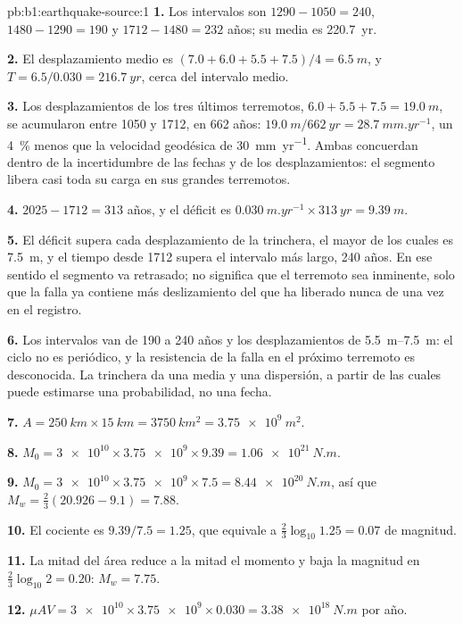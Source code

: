 \begin{solution}{pb:b1:earthquake-source:1}
\textbf{1.} Los intervalos son $1290 - 1050 = 240$, $1480 - 1290 = 190$ y
$1712 - 1480 = 232$ años; su media es \qty{220.7}{yr}.

\textbf{2.} El desplazamiento medio es $(7.0 + 6.0 + 5.5 + 7.5)/4 = \qty{6.5}{m}$, y
$T = 6.5/0.030 = \qty{216.7}{yr}$, cerca del intervalo medio.

\textbf{3.} Los desplazamientos de los tres últimos terremotos, $6.0 + 5.5 + 7.5 =
\qty{19.0}{m}$, se acumularon entre 1050 y 1712, en 662 años: $\qty{19.0}{m}
/\qty{662}{yr} = \qty{28.7}{mm.yr^{-1}}$, un \qty{4}{\percent} menos que la
velocidad geodésica de \qty{30}{mm.yr^{-1}}. Ambas concuerdan dentro de la incertidumbre de las
fechas y de los desplazamientos: el segmento libera casi toda su carga en sus grandes terremotos.

\textbf{4.} $2025 - 1712 = 313$ años, y el déficit es
$\qty{0.030}{m.yr^{-1}}\times\qty{313}{yr} = \qty{9.39}{m}$.

\textbf{5.} El déficit supera cada desplazamiento de la trinchera, el mayor de los cuales es
\qty{7.5}{m}, y el tiempo desde 1712 supera el intervalo más largo, 240 años.
En ese sentido el segmento va retrasado; no significa que el terremoto sea inminente, solo que la falla
ya contiene más deslizamiento del que ha liberado nunca de una vez en el registro.

\textbf{6.} Los intervalos van de 190 a 240 años y los desplazamientos de
\qtyrange{5.5}{7.5}{m}: el ciclo no es periódico, y la resistencia de la falla en el
próximo terremoto es desconocida. La trinchera da una media y una dispersión, a partir
de las cuales puede estimarse una probabilidad, no una fecha.

\textbf{7.} $A = \qty{250}{km}\times\qty{15}{km} = \qty{3750}{km^2} =
\qty{3.75e9}{m^2}$.

\textbf{8.} $M_0 = \num{3e10}\times\num{3.75e9}\times\num{9.39} =
\qty{1.06e21}{N.m}$.

\textbf{9.} $M_0 = \num{3e10}\times\num{3.75e9}\times\num{7.5} =
\qty{8.44e20}{N.m}$, así que $M_w = \tfrac23(20.926 - 9.1) = 7.88$.

\textbf{10.} El cociente es $9.39/7.5 = 1.25$, que equivale a $\tfrac23\log_{10}1.25 =
0.07$ de magnitud.

\textbf{11.} La mitad del área reduce a la mitad el momento y baja la magnitud en
$\tfrac23\log_{10}2 = 0.20$: $M_w = 7.75$.

\textbf{12.} $\mu A V = \num{3e10}\times\num{3.75e9}\times\num{0.030} =
\qty{3.38e18}{N.m}$ por año.


\end{solution}
